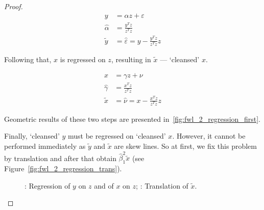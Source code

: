 \begin{proof}
\begin{equation}\label{eq:fwl_2_y_clean}
\begin{aligned}
y &= \alpha z + \varepsilon \\
\hat\alpha &= \frac{y^T z}{z^T z} \\
\tilde{y} &= \hat\varepsilon = y - \frac{y^T z}{z^T z}z
\end{aligned}
\end{equation}

Following that, $x$ is regressed on $z$, resulting in $\tilde{x}$ — `cleansed' $x$.

\begin{equation}\label{eq:fwl_2_x_clean}
\begin{aligned}
x &= \gamma z + \nu \\
\hat\gamma &= \frac{x^T z}{z^T z} \\
\tilde{x} &= \hat\nu = x - \frac{x^T z}{z^T z}z
\end{aligned}
\end{equation}

Geometric results of these two steps are presented in~\ref{fig:fwl_2_regression_first}.

Finally, `cleansed' $y$ must be regressed on `cleansed' $x$.
However, it cannot be performed immediately as $\tilde{y}$ and $\tilde{x}$ are skew lines.
So at first, we fix this problem by translation and after that obtain
$\hat\beta_1^{2}\tilde x$ (see Figure~\ref{fig:fwl_2_regression_trans}).

\begin{figure}[ht!]
\begin{center}
\hspace{4ex}
\caption{: Regression of $y$ on $z$ and of $x$ on $z$;
: Translation of $\tilde{x}$.}
\end{center}
\end{figure}


\end{proof}
